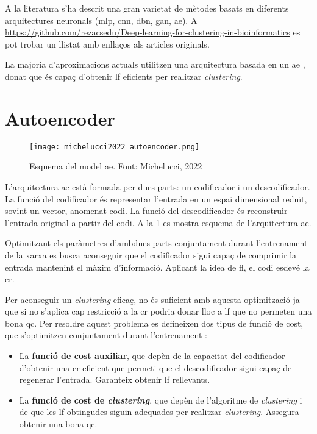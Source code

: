 \documentclass[CAT,BIB]{TFUOC}%
\begin{document}
        A la literatura s'ha descrit una gran varietat de mètodes basats en diferents arquitectures neuronals (\gls{mlp}, \gls{cnn}, \gls{dbn}, \gls{gan}, \gls{ae}). A \url{https://github.com/rezacsedu/Deep-learning-for-clustering-in-bioinformatics} \citep{Karim2021} es pot trobar un llistat amb enllaços als articles originals.

        La majoria d'aproximacions actuals utilitzen una arquitectura basada en un \gls{ae} \citep{Karim2021}, donat que és capaç d'obtenir \gls{lf} eficients per realitzar \textit{clustering}.


    \section{Autoencoder}
    \label{s:state_ae}

        \begin{figure}
            \centering
            \texttt{[image: michelucci2022\_autoencoder.png]}
            \caption[Esquema del model Autoencoder]{
                Esquema del model \gls{ae}.
                Font: Michelucci, 2022 \citep{Michelucci2022}
            }
            \label{f:ae_michelucci}
        \end{figure}

        L'arquitectura \gls{ae} està formada per dues parts: un codificador i un descodificador. La funció del codificador és representar l'entrada en un espai dimensional reduït, sovint un vector, anomenat codi. La funció del descodificador és reconstruir l'entrada original a partir del codi. A la \cref{f:ae_michelucci} es mostra esquema de l'arquitectura \gls{ae}.

        Optimitzant els paràmetres d'ambdues parts conjuntament durant l'entrenament de la xarxa es busca aconseguir que el codificador sigui capaç de comprimir la entrada mantenint el màxim d'informació. Aplicant la idea de \gls{fl}, el codi esdevé la \gls{cr}.

        Per aconseguir un \textit{clustering} eficaç, no és suficient amb aquesta optimització ja que si no s'aplica cap restricció a la \gls{cr} podria donar lloc a \gls{lf} que no permeten una bona \gls{qc}. Per resoldre aquest problema es defineixen dos tipus de funció de cost, que s'optimitzen conjuntament durant l'entrenament \citep{Min2018}:
        \begin{itemize}
            \item La \textbf{funció de cost auxiliar}, que depèn de la capacitat del codificador d'obtenir una \gls{cr} eficient que permeti que el descodificador sigui capaç de regenerar l'entrada. Garanteix obtenir \gls{lf} rellevants.
            \item La \textbf{funció de cost de \textit{clustering}}, que depèn de l'algoritme de \textit{clustering} i de que les \gls{lf} obtingudes siguin adequades per realitzar \textit{clustering}. Assegura obtenir una bona \gls{qc}.
        \end{itemize}
\end{document}
